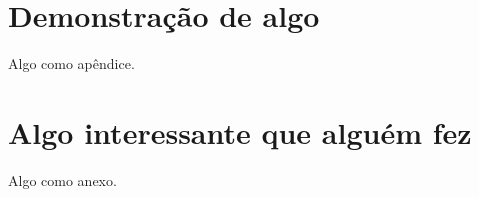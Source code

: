 \documentclass[oneside,openright,12pt]{ufsm_2015} %
\begin{document}
\apendice %

\chapter{Demonstração de algo}
\label{sec:apendice-demonst-algo}
        \par Algo como apêndice.  
        
\anexo    %

\chapter{Algo interessante que alguém fez}
\label{sec:anexo-algo-interessante}
         \par Algo como anexo.
\end{document}
